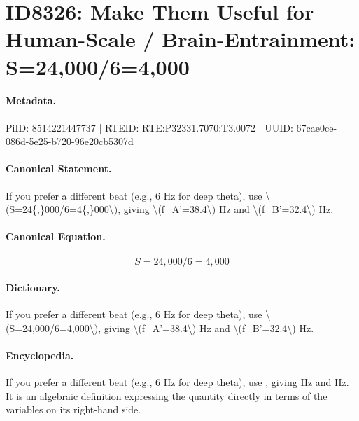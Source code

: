 \section*{ID8326: Make Them Useful for Human-Scale / Brain-Entrainment: S=24,000/6=4,000}
\paragraph{Metadata.}
PiID: 8514221447737 | RTEID: RTE:P32331.7070:T3.0072 | UUID: 67cae0ce-086d-5e25-b720-96e20cb5307d

\paragraph{Canonical Statement.}
If you prefer a different beat (e.g., 6 Hz for deep theta), use \textbackslash{}(S=24\{,\}000/6=4\{,\}000\textbackslash{}), giving \textbackslash{}(f\_A'=38.4\textbackslash{}) Hz and \textbackslash{}(f\_B'=32.4\textbackslash{}) Hz.

\paragraph{Canonical Equation.}
\[
S=24{,}000/6=4{,}000
\]

\paragraph{Dictionary.}
If you prefer a different beat (e.g., 6 Hz for deep theta), use \textbackslash{}(S=24,000/6=4,000\textbackslash{}), giving \textbackslash{}(f\_A'=38.4\textbackslash{}) Hz and \textbackslash{}(f\_B'=32.4\textbackslash{}) Hz.

\paragraph{Encyclopedia.}
If you prefer a different beat (e.g., 6 Hz for deep theta), use , giving Hz and Hz. It is an algebraic definition expressing the quantity directly in terms of the variables on its right-hand side.
